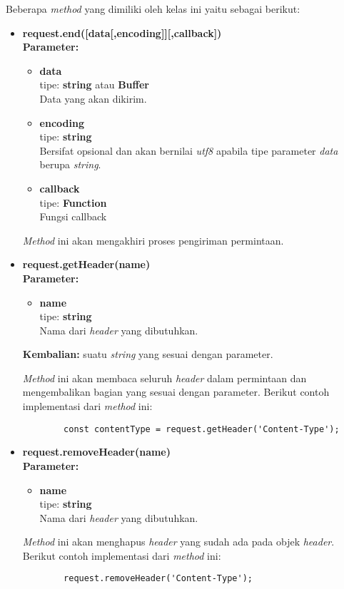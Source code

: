\begin{enumerate}
	Beberapa \textit{method} yang dimiliki oleh kelas ini yaitu sebagai berikut:
	\begin{itemize}
		\item \textbf{request.end([data[,encoding]][,callback])} \\ 
		\textbf{Parameter:} 
		\begin{itemize}
			\item \textbf{data} \\tipe: \textbf{string} atau \textbf{Buffer} \\ Data yang akan dikirim.
			\item \textbf{encoding} \\tipe: \textbf{string} \\ Bersifat opsional dan akan bernilai \textit{utf8} apabila tipe parameter \textit{data} berupa \textit{string}.
			\item \textbf{callback} \\tipe:	\textbf{Function} \\ Fungsi callback
		\end{itemize}
		
		\textit{Method} ini akan mengakhiri proses pengiriman permintaan.
		
		\item \textbf{request.getHeader(name)} \\
		\textbf{Parameter:} 
		\begin{itemize}
			\item \textbf{name} \\tipe: \textbf{string} \\ Nama dari \textit{header} yang dibutuhkan.
		\end{itemize}
		\textbf{Kembalian:} suatu \textit{string} yang sesuai dengan parameter.
		
		\textit{Method} ini akan membaca seluruh \textit{header} dalam permintaan dan mengembalikan bagian yang sesuai dengan parameter. Berikut contoh implementasi dari \textit{method} ini:
		\begin{lstlisting}
		const contentType = request.getHeader('Content-Type');
		\end{lstlisting}
		
		\item \textbf{request.removeHeader(name)} \\ 
		\textbf{Parameter:}
		\begin{itemize}
			\item \textbf{name} \\tipe: \textbf{string} \\ Nama dari \textit{header} yang dibutuhkan.
		\end{itemize}
		\textit{Method} ini akan menghapus \textit{header} yang sudah ada pada objek \textit{header}. Berikut contoh implementasi dari \textit{method} ini:
		\begin{lstlisting}
		request.removeHeader('Content-Type');
		\end{lstlisting}
		

\end{itemize}
\end{enumerate}
